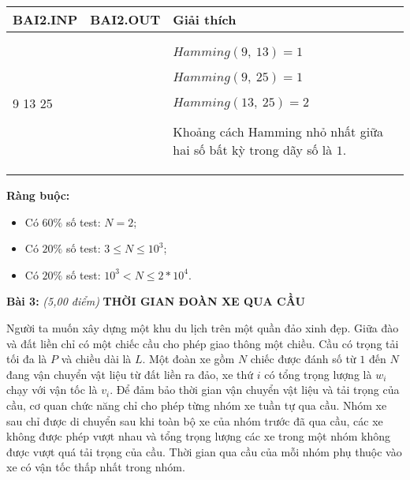 \documentclass[
]{article}
\begin{document}
\begin{longtable}[]{@{}
  >{\raggedright\arraybackslash}p{}
  >{\raggedright\arraybackslash}p{}
  >{\raggedright\arraybackslash}p{}
  >{\raggedright\arraybackslash}p{}@{}}
\toprule\noalign{}
\begin{minipage}[b]{\linewidth}\centering
\textbf{BAI2.INP}
\end{minipage} & \begin{minipage}[b]{\linewidth}\centering
\textbf{BAI2.OUT}
\end{minipage} & \begin{minipage}[b]{\linewidth}\centering
\textbf{Giải thích}
\end{minipage} & \begin{minipage}[b]{\linewidth}\centering
\end{minipage} \\
\midrule\noalign{}
\endhead
\bottomrule\noalign{}
\endlastfoot
3

9 13 25 & 1 & \(Hamming(9,\ 13) = 1\)

\(Hamming(9,\ 25) = 1\)

\(Hamming(13,\ 25) = 2\)

Khoảng cách Hamming nhỏ nhất giữa hai số bất kỳ trong dãy số là \(1\).
& \\
\end{longtable}

\textbf{Ràng buộc:}

\begin{itemize}
\item
  Có \(60\%\) số test: \(N = 2\);
\item
  Có \(20\%\) số test: \(3 \leq N \leq 10^{3}\);
\item
  Có \(20\%\) số test: \(10^{3} < N \leq 2*10^{4}\).
\end{itemize}

\textbf{Bài 3:} \emph{(5,00 điểm)} \textbf{THỜI GIAN ĐOÀN XE QUA CẦU}

Người ta muốn xây dựng một khu du lịch trên một quần đảo xinh đẹp. Giữa
đào và đất liền chỉ có một chiếc cầu cho phép giao thông một chiều. Cầu
có trọng tải tối đa là \(P\) và chiều dài là \(L\). Một đoàn xe gồm
\(N\) chiếc được đánh số từ \(1\) đến \(N\) đang vận chuyển vật liệu từ
đất liền ra đảo, xe thứ \(i\) có tổng trọng lượng là \(w_{i}\) chạy với
vận tốc là \(v_{i}\). Để đảm bảo thời gian vận chuyển vật liệu và tải
trọng của cầu, cơ quan chức năng chỉ cho phép từng nhóm xe tuần tự qua
cầu. Nhóm xe sau chỉ được di chuyển sau khi toàn bộ xe của nhóm trước đã
qua cầu, các xe không được phép vượt nhau và tổng trọng lượng các xe
trong một nhóm không được vượt quá tải trọng của cầu. Thời gian qua cầu
của mỗi nhóm phụ thuộc vào xe có vận tốc thấp nhất trong nhóm.
\end{document}
